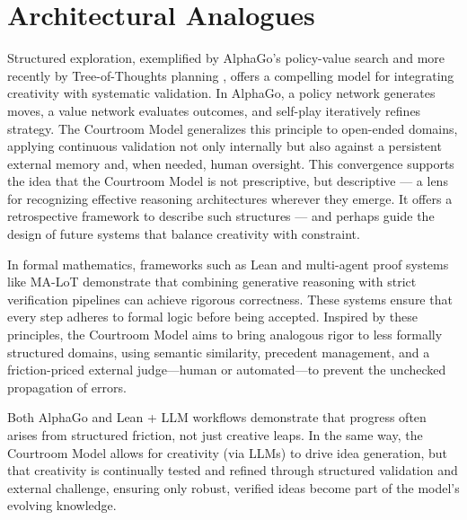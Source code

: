 \documentclass[11pt]{article}
\begin{document}
\section{Architectural Analogues}
\label{sec:analogues}
Structured exploration, exemplified by AlphaGo's policy-value search \citep{silver2016alphago} and more recently by Tree-of-Thoughts planning \citep{yao2023tree}, offers a compelling model for integrating creativity with systematic validation. In AlphaGo, a policy network generates moves, a value network evaluates outcomes, and self-play iteratively refines strategy. The Courtroom Model generalizes this principle to open-ended domains, applying continuous validation not only internally but also against a persistent external memory and, when needed, human oversight. This convergence supports the idea that the Courtroom Model is not prescriptive, but descriptive — a lens for recognizing effective reasoning architectures wherever they emerge. It offers a retrospective framework to describe such structures — and perhaps guide the design of future systems that balance creativity with constraint.

In formal mathematics, frameworks such as Lean \citep{mathlib2020lean} and multi-agent proof systems like MA-LoT \citep{wang2025malot} demonstrate that combining generative reasoning with strict verification pipelines can achieve rigorous correctness. These systems ensure that every step adheres to formal logic before being accepted. Inspired by these principles, the Courtroom Model aims to bring analogous rigor to less formally structured domains, using semantic similarity, precedent management, and a friction-priced external judge—human or automated—to prevent the unchecked propagation of errors.

Both AlphaGo and Lean + LLM workflows demonstrate that progress often arises from structured friction, not just creative leaps. In the same way, the Courtroom Model allows for creativity (via LLMs) to drive idea generation, but that creativity is continually tested and refined through structured validation and external challenge, ensuring only robust, verified ideas become part of the model's evolving knowledge.
\end{document}
